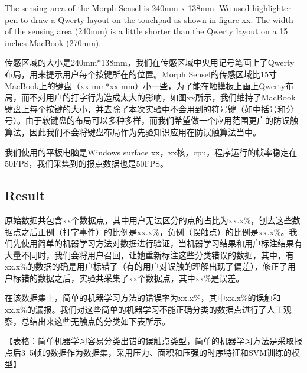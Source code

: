 
The sensing area of the Morph Sensel is 240mm x 138mm. We used highlighter pen to draw a Qwerty layout on the touchpad as shown in figure xx. The width of the sensing area (240mm) is a little shorter than the Qwerty layout on a 15 inches MacBook (270mm). 

传感区域的大小是240mm*138mm，我们在传感区域中央用记号笔画上了Qwerty布局，用来提示用户每个按键所在的位置。Morph Sensel的传感区域比15寸MacBook上的键盘（xx-mm*xx-mm）小一些，为了能在触摸板上画上Qwerty布局，而不对用户的打字行为造成太大的影响，如图xx所示，我们维持了MacBook键盘上每个按键的大小，并去除了本次实验中不会用到的符号键（如中括号和分号）。由于软键盘的布局可以多种多样，而我们希望做一个应用范围更广的防误触算法，因此我们不会将键盘布局作为先验知识应用在防误触算法当中。

我们使用的平板电脑是Windows surface xx，xx核，cpu，程序运行的帧率稳定在50FPS，我们采集到的报点数据也是50FPS。

\subsection{Result}

原始数据共包含xx个数据点，其中用户无法区分的点的占比为xx.x\%，刨去这些数据点之后正例（打字事件）的比例是xx.x\%，负例（误触点）的比例是xx.x\%。我们先使用简单的机器学习方法对数据进行验证，当机器学习结果和用户标注结果有大量不同时，我们会将用户召回，让她重新标注这些分类错误的数据，其中，有xx.x\%的数据的确是用户标错了（有的用户对误触的理解出现了偏差），修正了用户标错的数据之后，实验共采集了xx个数据点，其中xx\%是误差。

在该数据集上，简单的机器学习方法的错误率为xx.x\%，其中xx.x\%的误触和xx.x\%的漏报。我们对这些简单的机器学习不能正确分类的数据点进行了人工观察，总结出来这些无触点的分类如下表所示。

【表格：简单机器学习容易分类出错的误触点类型，简单的机器学习方法是采取报点后3~5帧的数据作为数据集，采用压力、面积和压强的时序特征和SVM训练的模型】

